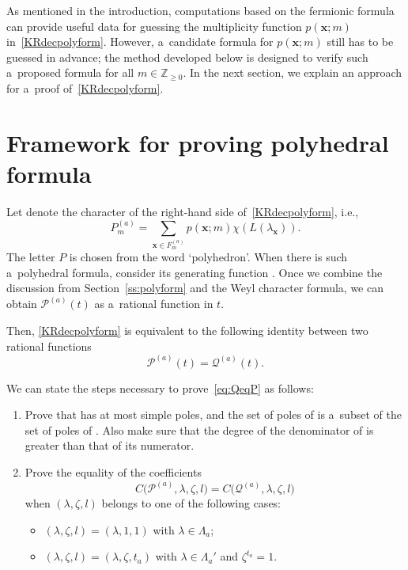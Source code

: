\documentclass[pdftex]{sigma}
\numberwithin{equation}{section}
\theoremstyle{definition}
\newcommand{\Z}{\mathbb{Z}}
\newcommand\Fam{F^{(a)}_{m}}
\newcommand\Qa{\mathcal{Q}^{(a)}}
\newcommand\Pa{\mathcal{P}^{(a)}}
\newcommand\Pam{P^{(a)}_{m}}
\newcommand\La{\Lambda}
\newcommand\la{\lambda}
\begin{document}
As mentioned in the introduction, computations based on the fermionic formula can provide useful data for guessing the multiplicity function $p(\mathbf{x};m)$ in~\eqref{KRdecpolyform}. However, a~candidate formula for $p(\mathbf{x};m)$ still has to be guessed in advance; the method developed below is designed to verify such a~proposed formula for all $m\in \Z_{\geq 0}$. In the next section, we explain an approach for a~proof of~\eqref{KRdecpolyform}.


\section{Framework for proving polyhedral formula}\label{sec:framework}
Let \smash{$\Pam$} denote the character of the right-hand side of~\eqref{KRdecpolyform}, i.e.,
\[
\Pam=\sum_{\mathbf{x}\in \Fam}p(\mathbf{x};m)\chi(L(\la_{\mathbf{x}})).
\]
The letter $P$ is chosen from the word `polyhedron'.
When there is such a~polyhedral formula, consider its generating function
\smash{$
\Pa(t) : = \sum_{m=0}^{\infty}\Pam t^m$}.
Once we combine the discussion from Section~\ref{ss:polyform} and the Weyl character formula, we can obtain $\Pa(t)$ as a~rational function in $t$.

Then, \eqref{KRdecpolyform} is equivalent to the following identity between two rational functions
\begin{equation}\label{eq:QeqP}
\Pa(t) = \Qa(t).
\end{equation}

We can state the steps necessary to prove~\eqref{eq:QeqP} as follows:
\begin{enumerate}[label=(\roman*)]\itemsep=0pt
\item\label{algo:resloc} Prove that \smash{$\Pa$} has at most simple poles, and the set of poles of \smash{$\Pa$} is a~subset of the set of poles of \smash{$\Qa$}. Also make sure that the degree of the denominator of \smash{$\Pa$} is greater than that of its numerator.
\item\label{algo:rescompe} Prove the equality of the coefficients
\begin{equation}\label{eqn:CPCQ}
C\bigl(\Pa,\la,\zeta,l\bigr) = C\bigl(\Qa,\la,\zeta,l\bigr)
\end{equation}
when $(\la,\zeta,l)$ belongs to one of the following cases:
\begin{itemize}\itemsep=0pt
\item $(\la,\zeta,l)=(\la,1,1)$ with $\la\in \La_a$;
\item $(\la,\zeta,l)=(\la,\zeta,t_a)$ with $\la\in \La_a'$ and $\zeta^{t_a}=1$.
\end{itemize}
\end{enumerate}
\end{document}
